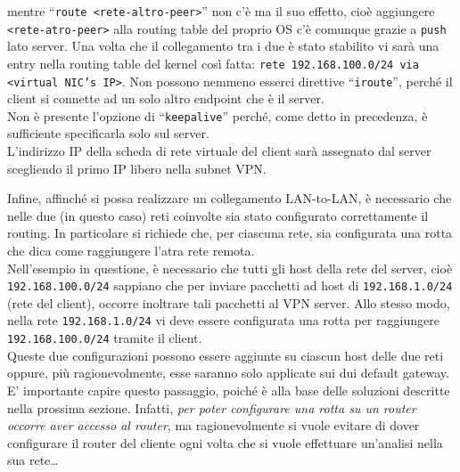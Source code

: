 mentre ``\texttt{route <rete-altro-peer>}'' non c'è ma il suo effetto, cioè aggiungere
\texttt{<rete-atro-peer>} alla routing table del proprio OS c'è comunque grazie a \texttt{push}
lato server.
Una volta che il collegamento tra i due è stato stabilito vi sarà una entry
nella routing table del kernel così fatta: \texttt{rete 192.168.100.0/24 via
	<virtual NIC's IP>}. Non possono nemmeno esserci direttive ``\texttt{iroute}'', perché
il client si connette ad un solo altro endpoint che è il server.\\
Non è presente l'opzione di ``\texttt{keepalive}'' perché, come detto in
precedenza, è sufficiente specificarla solo sul server.\\
L'indirizzo IP della scheda di rete virtuale del client sarà assegnato dal server scegliendo
il primo IP libero nella subnet VPN.


Infine, affinché si possa realizzare un collegamento LAN-to-LAN, è necessario che
nelle due (in questo caso) reti coinvolte sia stato configurato correttamente
il routing. In particolare si richiede che, per ciascuna rete, sia configurata una rotta
che dica come raggiungere l'atra rete remota.\\
Nell'esempio in questione, è necessario che tutti gli host della rete del server, cioè
\texttt{192.168.100.0/24} sappiano che per inviare pacchetti ad host di \texttt{192.168.1.0/24}
(rete del client), occorre inoltrare tali pacchetti al VPN server. Allo stesso modo,
nella rete \texttt{192.168.1.0/24} vi deve essere configurata una rotta per raggiungere
\texttt{192.168.100.0/24} tramite il client.\\
Queste due configurazioni possono essere aggiunte su ciascun host delle due reti oppure,
più ragionevolmente, esse saranno solo applicate sui dui default gateway. E' importante
capire questo passaggio, poiché è alla base delle soluzioni descritte nella prossima
sezione. Infatti, \textit{per poter configurare una rotta su un router occorre aver
accesso al router}, ma ragionevolmente si vuole evitare di dover configurare
il router del cliente ogni volta che si vuole effettuare un'analisi nella sua rete\ldots




